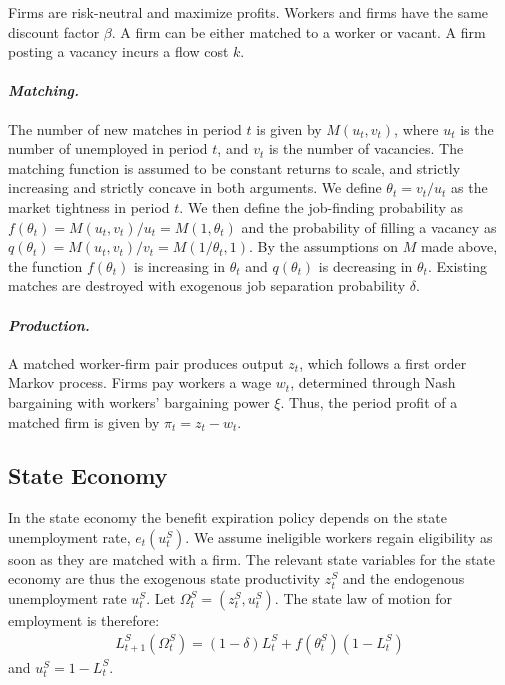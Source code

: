 \documentclass[12pt]{article}
\newcommand{\1}{\mathbf{1}}
\newcommand{\ust}{u^S_t}
\newcommand{\zst}{z^S_t}
\newcommand{\tst}{\theta^S_t}
\newcommand{\ost}{\Omega^S_t}
\begin{document}
\begin{appendix}
Firms are risk-neutral and maximize profits. Workers and firms have the same discount factor $\beta$. A firm can be either matched to a worker or vacant. A firm posting a vacancy incurs a flow cost $k$.

\vspace{-0.4cm}\paragraph{\textit{Matching.}}
The number of new matches in period $t$ is given by $M(u_t,v_t)$, where $u_t$ is the number of unemployed in period $t$, and $v_t$ is the number of vacancies.  The matching function is assumed to be constant returns to scale, and strictly increasing and strictly concave in both arguments.  We define $\theta_t=v_t/u_t$ as the market tightness in period $t$. We then define the job-finding probability as $f(\theta_t)=M(u_t,v_t)/u_t=M(1,\theta_t)$ and the probability of filling a vacancy as $q(\theta_t)=M(u_t,v_t)/v_t=M(1/\theta_t,1)$. By the assumptions on $M$ made above, the function $f(\theta_t)$ is increasing in $\theta_t$ and $q(\theta_t)$ is decreasing in $\theta_t$. Existing matches are destroyed with exogenous job separation probability $\delta$.

\vspace{-0.4cm}\paragraph{\textit{Production.}}  A matched worker-firm pair produces output $z_t$, which follows a first order Markov process.  Firms pay workers a wage $w_t$, determined through Nash bargaining with workers' bargaining power $\xi$. Thus, the period profit of a matched firm is given by $\pi_t = z_t - w_t$.


\subsection{State Economy}

In the state economy the benefit expiration policy depends on the state unemployment rate, $e_t(\ust)$.  We assume ineligible workers regain eligibility as soon as they are matched with a firm.  The relevant state variables for the state economy are thus the exogenous state productivity $\zst$ and the endogenous unemployment rate $\ust$.  Let $\ost=(\zst,\ust)$. The state law of motion for employment is therefore:
\begin{eqnarray}
L^S_{t+1}(\ost)=(1-\delta)L^S_{t}+f(\tst)\left(1-L^S_t\right) \label{LOML}
\end{eqnarray}
and $\ust=1-L^S_t$.


\end{appendix}
\end{document}
